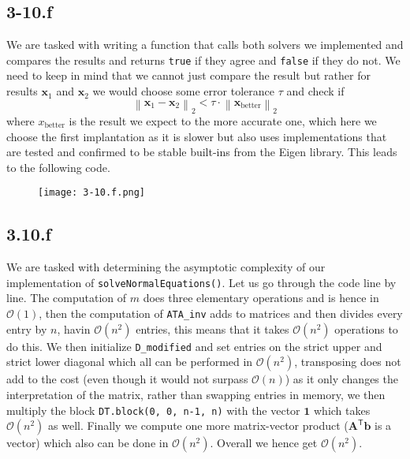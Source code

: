\documentclass{article}
\begin{document}
\subsection*{3-10.f}
We are tasked with writing a function that calls both solvers we implemented and compares the results and returns \verb|true| if they agree and \verb|false| if they do not. We need to keep in mind that we cannot just compare the result but rather for results $\mathbf{x}_{1}$ and $\mathbf{x}_{2}$ we would choose some error tolerance $\tau$ and check if
\begin{equation*}
    \left\lVert \mathbf{x}_{1} - \mathbf{x}_{2} \right\rVert_{2} < \tau \cdot \left\lVert \mathbf{x}_{\text{better}}\right\rVert_{2}
\end{equation*}
where $x_{\text{better}}$ is the result we expect to the more accurate one, which here we choose the first implantation as it is slower but also uses implementations that are tested and confirmed to be stable built-ins from the Eigen library. This leads to the following code.

\begin{figure}[!hbt]
    \centering
\texttt{[image: 3-10.f.png]}
\end{figure}
\subsection*{3.10.f}
We are tasked with determining the asymptotic complexity of our implementation of \verb|solveNormalEquations()|. Let us go through the code line by line. The computation of $m$ does three elementary operations and is hence in $\mathcal{O}\left(1\right)$, then the computation of \verb|ATA_inv| adds to matrices and then divides every entry by $n$, havin $\mathcal{O}\left(n^{2}\right)$ entries, this means that it takes $\mathcal{O}\left(n^{2}\right)$ operations to do this. We then initialize \verb|D_modified| and set entries on the strict upper and strict lower diagonal which all can be performed in $\mathcal{O}\left(n^{2}\right)$, transposing does not add to the cost (even though it would not surpass $\mathcal{O}\left(n\right)$) as it only changes the interpretation of the matrix, rather than swapping entries in memory, we then multiply the block \verb|DT.block(0, 0, n-1, n)| with the vector $\mathbf{1}$ which takes $\mathcal{O}\left(n^{2}\right)$ as well. Finally we compute one more matrix-vector product ($\mathbf{A}^{\mathsf{T}}\mathbf{b}$ is a vector) which also can be done in $\mathcal{O}\left(n^{2}\right)$. Overall we hence get $\mathcal{O}\left(n^{2}\right)$.
\end{document}
